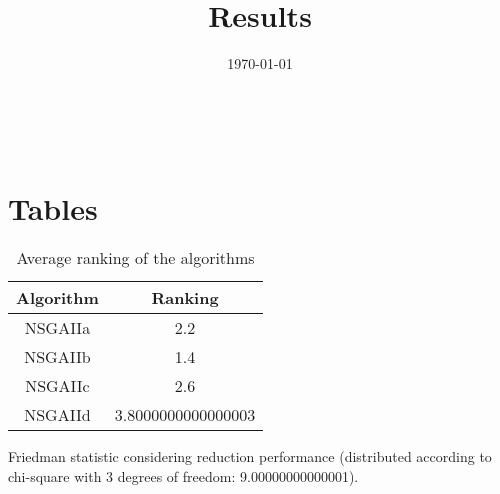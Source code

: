 \documentclass{article}
\title{Results}
\author{}
\date{\today}
\begin{document}
\oddsidemargin 0in \topmargin 0in\maketitle
\
\section{Tables}
\begin{table}[!htp]
\centering
\caption{Average ranking of the algorithms}
\begin{tabular}{c|c}
Algorithm&Ranking\\
\hline
NSGAIIa&2.2\\
NSGAIIb&1.4\\
NSGAIIc&2.6\\
NSGAIId&3.8000000000000003\\
\end{tabular}
\end{table}


Friedman statistic considering reduction performance (distributed according to chi-square with 3 degrees of freedom: 9.00000000000001).
\end{document}

